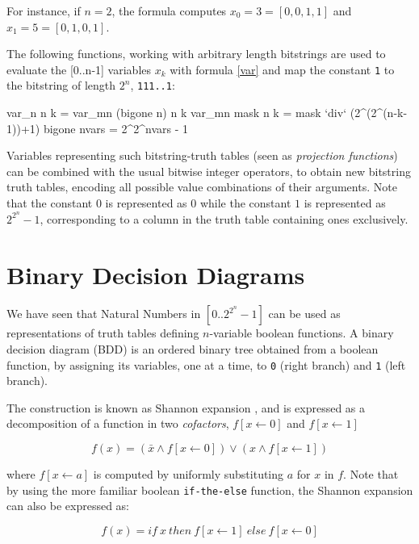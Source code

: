\documentclass[]{INCLUDES/llncs}
\begin{document}
\noindent For instance, if $n=2$, the formula computes 
$x_0=3=[0,0,1,1]$ and $x_1=5=[0,1,0,1]$.

The following functions, working with arbitrary length bitstrings are
used to evaluate the [0..n-1] variables $x_k$ with formula \ref{var} and map the
constant {\tt 1} to the bitstring of length $2^n$, {\tt 111..1}:
\begin{code}
var_n n k = var_mn (bigone n) n k
var_mn mask n k = mask `div` (2^(2^(n-k-1))+1)
bigone nvars = 2^2^nvars - 1
\end{code}
Variables representing such bitstring-truth tables 
(seen as {\em projection functions}) 
can be combined with the usual bitwise integer operators, 
to obtain new bitstring truth tables, 
encoding all possible value combinations of their arguments.
Note that the constant $0$ is represented as $0$ while the constant $1$
is represented as $2^{2^n}-1$, corresponding to a column in
the truth table containing ones exclusively.

\section{Binary Decision Diagrams} \label {bdds}

We have seen that Natural Numbers in $[0..{2^{2^n}-1}]$ can be used as
representations of truth tables defining $n$-variable boolean functions.
A binary decision diagram (BDD) \cite{bryant86graphbased} is an ordered binary 
tree obtained from a boolean function, by assigning its variables, one at a time, 
to {\tt 0}  (right branch) and {\tt 1} (left branch). 

The construction is known as Shannon expansion \cite{shannon_all}, and is
expressed as a decomposition of a function in two {\em cofactors}, $f[x
\leftarrow 0]$ and $f[x \leftarrow 1]$

\begin{equation}
f(x)= (\bar{x} \wedge f[x \leftarrow 0]) \vee (x \wedge f[x \leftarrow 1])
\end{equation}

\noindent where $f[x \leftarrow a]$ is computed 
by uniformly substituting $a$ for $x$ in $f$. Note that by using the more
familiar boolean {\tt if-the-else} function, the Shannon expansion can also
 be expressed as:

\begin{equation}
f(x) = if~x~then~f[x \leftarrow 1]~else~f[x \leftarrow 0]
\end{equation}
\end{document}
